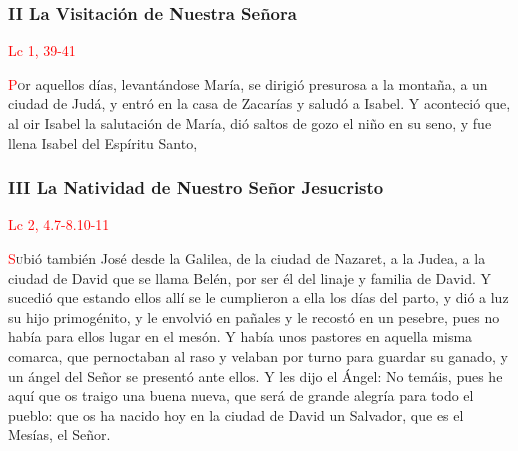 \documentclass[10pt,twoside]{book}
\begin{document}
\vspace{0.5em}



\vspace{1.5em}

\noindent\subsubsection*{II La Visitación de Nuestra Señora}

\vspace{-0.5em}

\hfill\textcolor{red}{Lc 1, 39-41}

\lettrine[lines=2]{\textcolor{red}{P}}or aquellos días, levantándose María, se dirigió presurosa a la montaña, a un ciudad de Judá, 
y entró en la casa de Zacarías y saludó a Isabel. Y aconteció que, al oir Isabel la salutación de María, dió saltos de 
gozo el niño en su seno, y fue llena Isabel del Espíritu Santo,

\vspace{0.5em}



\vspace{1.5em}

\noindent\subsubsection*{III La Natividad de Nuestro Señor Jesucristo}

\vspace{-0.5em}

\hfill\textcolor{red}{Lc 2, 4.7-8.10-11}

\lettrine[lines=2]{\textcolor{red}{S}}ubió también José desde la Galilea, de la ciudad de Nazaret, a la Judea, a la ciudad de David que se llama Belén, por ser él del linaje y familia de David.
Y sucedió que estando ellos allí se le cumplieron a ella los días del parto, y dió a luz su hijo primogénito, y le envolvió en pañales y le recostó en un pesebre, 
pues no había para ellos lugar en el mesón. Y había unos pastores en aquella misma comarca, que pernoctaban al raso y velaban por turno para guardar su ganado, 
y un ángel del Señor se presentó ante ellos. Y les dijo el Ángel: No temáis, pues he aquí que os traigo una buena nueva, que será de grande alegría para todo el pueblo: 
que os ha nacido hoy en la ciudad de David un Salvador, que es el Mesías, el Señor.
\end{document}
